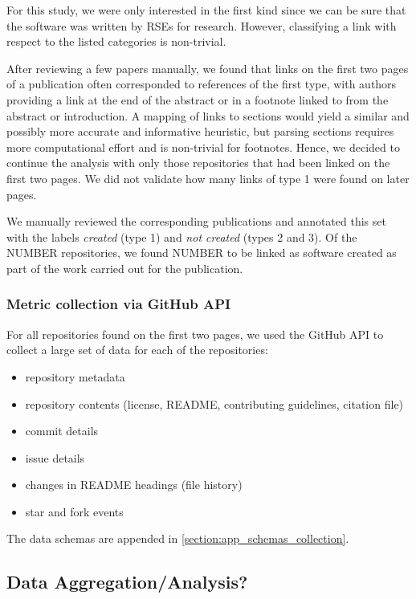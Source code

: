 \documentclass[10pt,a4paper]{scrartcl}
\begin{document}
For this study, we were only interested in the first kind since we can be sure that the software was written by RSEs for research.
However, classifying a link with respect to the listed categories is non-trivial.

After reviewing a few papers manually, we found that links on the first two pages of a publication often corresponded to references of the first type,
with authors providing a link at the end of the abstract or in a footnote linked to from the abstract or introduction.
A mapping of links to sections would yield a similar and possibly more accurate and informative heuristic,
but parsing sections requires more computational effort and is non-trivial for footnotes.
Hence, we decided to continue the analysis with only those repositories that had been linked on the first two pages.
We did not validate how many links of type 1 were found on later pages.

We manually reviewed the corresponding publications and annotated this set with the labels \textit{created} (type 1) and \textit{not created} (types 2 and 3).
Of the NUMBER repositories, we found NUMBER to be linked as software created as part of the work carried out for the publication.

\subsubsection*{Metric collection via GitHub API}

For all repositories found on the first two pages, we used the GitHub API to collect a large set of data for each of the repositories:

\begin{itemize}
    \item repository metadata
    \item repository contents (license, README, contributing guidelines, citation file)
    \item commit details
    \item issue details
    \item changes in README headings (file history)
    \item star and fork events
\end{itemize}

The data schemas are appended in \ref{section:app_schemas_collection}.

\subsection*{Data Aggregation/Analysis?}
\end{document}
